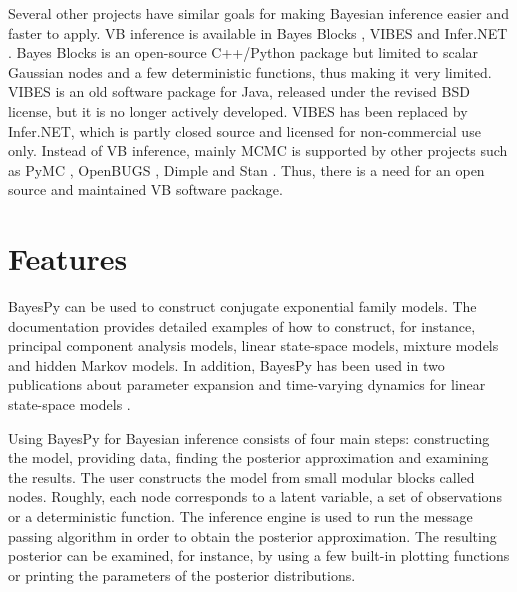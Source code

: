 \documentclass[twoside,11pt]{article}
\begin{document}
Several other projects have similar goals for making Bayesian inference easier
and faster to apply.  VB inference is available in Bayes Blocks
\citep{Raiko:2007}, VIBES \citep{Bishop:2002} and Infer.NET \citep{Infer.NET}.
Bayes Blocks is an open-source C++/Python package but limited to scalar Gaussian
nodes and a few deterministic functions, thus making it very limited.  VIBES is
an old software package for Java, released under the revised BSD license, but it
is no longer actively developed.  VIBES has been replaced by Infer.NET, which
is partly closed source and licensed for non-commercial use only.  Instead of VB
inference, mainly MCMC is supported by other projects such as PyMC \citep{PyMC},
OpenBUGS \citep{OpenBUGS}, Dimple \citep{Dimple} and Stan \citep{Stan}.  Thus,
there is a need for an open source and maintained VB software package.



\section{Features}


BayesPy can be used to construct conjugate exponential family models.  The
documentation provides detailed examples of how to construct, for instance,
principal component analysis models, linear state-space models, mixture models
and hidden Markov models.  In addition, BayesPy has been used in two
publications about parameter expansion and time-varying dynamics for linear
state-space models \citep{Luttinen:2013,Luttinen:2014}.



Using BayesPy for Bayesian inference consists of four main steps: constructing
the model, providing data, finding the posterior approximation and examining the
results.  The user constructs the model from small modular blocks called nodes.
Roughly, each node corresponds to a latent variable, a set of observations or a
deterministic function.
The inference engine is used to run the message passing algorithm in order to
obtain the posterior approximation.  The resulting posterior can be examined,
for instance, by using a few built-in plotting functions or printing the
parameters of the posterior distributions.
\end{document}
